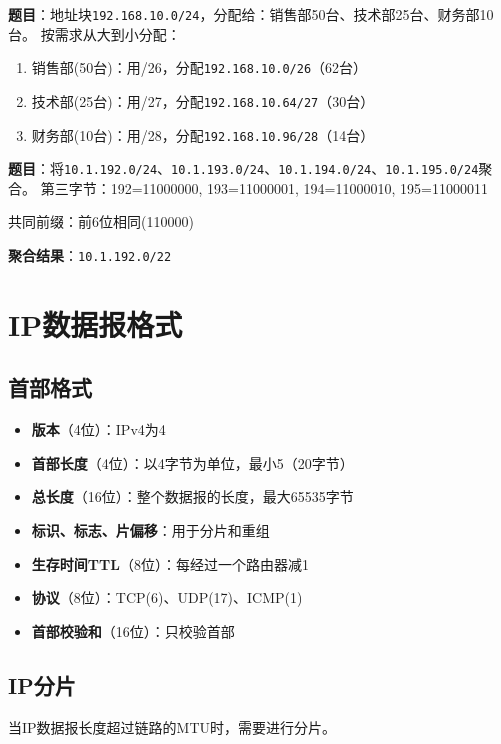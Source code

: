 \begin{examplebox}[例题4.3 VLSM地址分配]
\textbf{题目}：地址块\texttt{192.168.10.0/24}，分配给：销售部50台、技术部25台、财务部10台。
\tcblower
按需求从大到小分配：
\begin{enumerate}[itemsep=0pt]
    \item 销售部(50台)：用/26，分配\texttt{192.168.10.0/26}（62台）
    \item 技术部(25台)：用/27，分配\texttt{192.168.10.64/27}（30台）
    \item 财务部(10台)：用/28，分配\texttt{192.168.10.96/28}（14台）
\end{enumerate}
\end{examplebox}

\begin{examplebox}[例题4.4 路由聚合]
\textbf{题目}：将\texttt{10.1.192.0/24}、\texttt{10.1.193.0/24}、\texttt{10.1.194.0/24}、\texttt{10.1.195.0/24}聚合。
\tcblower
第三字节：192=11000000, 193=11000001, 194=11000010, 195=11000011

共同前缀：前6位相同(110000)

\textbf{聚合结果}：\texttt{10.1.192.0/22}
\end{examplebox}

\section{IP数据报格式}
\subsection{首部格式}
\begin{itemize}[leftmargin=2em,itemsep=0pt]
    \item \textbf{版本}（4位）：IPv4为4
    \item \textbf{首部长度}（4位）：以4字节为单位，最小5（20字节）
    \item \textbf{总长度}（16位）：整个数据报的长度，最大65535字节
    \item \textbf{标识、标志、片偏移}：用于分片和重组
    \item \textbf{生存时间TTL}（8位）：每经过一个路由器减1
    \item \textbf{协议}（8位）：TCP(6)、UDP(17)、ICMP(1)
    \item \textbf{首部校验和}（16位）：只校验首部
\end{itemize}

\subsection{IP分片}
当IP数据报长度超过链路的MTU时，需要进行分片。

